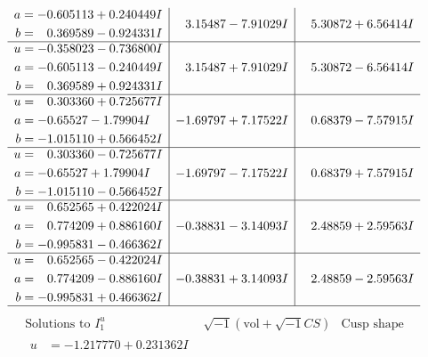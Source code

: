 \documentclass[1p]{elsarticle_modified}
\theoremstyle{definition}
\newcommand{\I}{\sqrt{-1}}
\begin{document}
$$\begin{array}{c|c|c}
\begin{aligned}
a &= -0.605113 + 0.240449 I \\
b &= \phantom{-}0.369589 - 0.924331 I\end{aligned}
 & \phantom{-}3.15487 - 7.91029 I & \phantom{-}5.30872 + 6.56414 I \\ \hline\begin{aligned}
u &= -0.358023 - 0.736800 I \\
a &= -0.605113 - 0.240449 I \\
b &= \phantom{-}0.369589 + 0.924331 I\end{aligned}
 & \phantom{-}3.15487 + 7.91029 I & \phantom{-}5.30872 - 6.56414 I \\ \hline\begin{aligned}
u &= \phantom{-}0.303360 + 0.725677 I \\
a &= -0.65527 - 1.79904 I \\
b &= -1.015110 + 0.566452 I\end{aligned}
 & -1.69797 + 7.17522 I & \phantom{-}0.68379 - 7.57915 I \\ \hline\begin{aligned}
u &= \phantom{-}0.303360 - 0.725677 I \\
a &= -0.65527 + 1.79904 I \\
b &= -1.015110 - 0.566452 I\end{aligned}
 & -1.69797 - 7.17522 I & \phantom{-}0.68379 + 7.57915 I \\ \hline\begin{aligned}
u &= \phantom{-}0.652565 + 0.422024 I \\
a &= \phantom{-}0.774209 + 0.886160 I \\
b &= -0.995831 - 0.466362 I\end{aligned}
 & -0.38831 - 3.14093 I & \phantom{-}2.48859 + 2.59563 I \\ \hline\begin{aligned}
u &= \phantom{-}0.652565 - 0.422024 I \\
a &= \phantom{-}0.774209 - 0.886160 I \\
b &= -0.995831 + 0.466362 I\end{aligned}
 & -0.38831 + 3.14093 I & \phantom{-}2.48859 - 2.59563 I\\
 \hline 
 \end{array}$$\newpage$$\begin{array}{c|c|c}  
\text{Solutions to }I^u_{1}& \I (\text{vol} + \sqrt{-1}CS) & \text{Cusp shape}\\
 \hline 
\begin{aligned}
u &= -1.217770 + 0.231362 I \\

\end{aligned}
\end{array}$$
\end{document}
